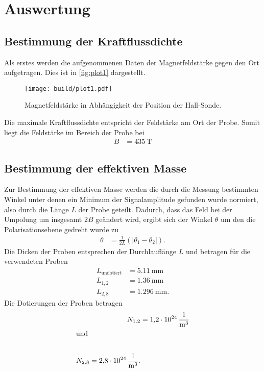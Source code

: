\section{Auswertung}
\label{sec:Auswertung}


\subsection{Bestimmung der Kraftflussdichte}
\label{sub:Kraftflussdichte}

Als erstes werden die aufgenommenen Daten der Magnetfeldstärke gegen den Ort aufgetragen.
Dies ist in \autoref{fig:plot1} dargestellt.
\begin{figure}[H]
  \centering
  \texttt{[image: build/plot1.pdf]}
  \caption {Magnetfeldstärke in Abhängigkeit der Position der Hall-Sonde.}
  \label{fig:plot1}
\end{figure}


Die maximale Kraftflussdichte entspricht der Feldstärke am Ort der Probe.
Somit liegt die Feldstärke im Bereich der Probe bei 
\begin{align*}
  B &= \qty{435}{\tesla}
\end{align*}

\subsection{Bestimmung der effektiven Masse}
\label{sub:effektiveMasse}

Zur Bestimmung der effektiven Masse werden die durch die Messung bestimmten Winkel unter denen ein Minimum der Signalamplitude gefunden wurde
normiert, also durch die Länge $L$ der Probe geteilt.
Dadurch, dass das Feld bei der Umpolung um insgesamt $\num{2}B$ geändert wird, ergibt sich der Winkel $\theta$ um den die Polarisationsebene
gedreht wurde zu
\begin{align}
  \theta &= \frac{1}{2L}(\lvert \theta_1-\theta_2 \rvert).
\end{align}
Die Dicken der Proben entsprechen der Durchlauflänge $L$ und betragen für die verwendeten Proben
\begin{align*}
  L_{\text{undotiert}}&= \qty{5.11}{\milli\meter}\\
  L_{1,2}&= \qty{1.36}{\milli\meter}\\
  L_{2,8}&= \qty{1.296}{\milli\meter}.
\end{align*}
Die Dotierungen der Proben betragen
\begin{align*}
  N_{1.2}&= \qty{1.2 e24}{\per\cubic\meter}\\
  \shortintertext{und}\\
  N_{2.8}= \qty{2.8 e24}{\per\cubic\meter}.
\end{align*}

